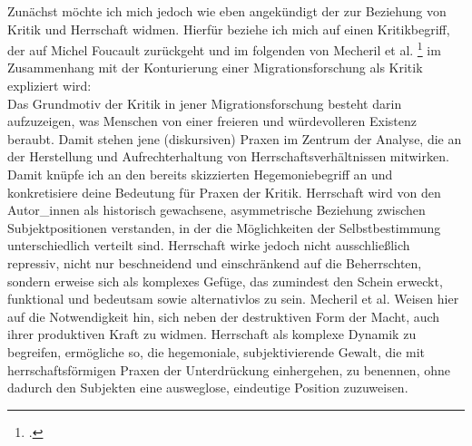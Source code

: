Zunächst möchte ich mich jedoch wie eben angekündigt der zur Beziehung von
Kritik und Herrschaft widmen. Hierfür beziehe ich mich auf einen Kritikbegriff,
der auf Michel Foucault zurückgeht und im folgenden von Mecheril et al.
\footnotemark \footcitetext{mecherilmigration} im
Zusammenhang mit der Konturierung einer Migrationsforschung als Kritik
expliziert wird: \\ 
Das Grundmotiv der Kritik in jener Migrationsforschung
besteht darin aufzuzeigen, was Menschen von einer freieren und würdevolleren
Existenz beraubt. Damit stehen jene (diskursiven) Praxen im Zentrum der
Analyse, die an der Herstellung und Aufrechterhaltung von
Herrschaftsverhältnissen mitwirken.\footnotemark {}
Damit knüpfe ich an den bereits
skizzierten Hegemoniebegriff an und konkretisiere deine Bedeutung für Praxen
der Kritik. Herrschaft wird von den Autor\_innen als historisch gewachsene,
asymmetrische Beziehung zwischen Subjektpositionen verstanden, in der die
Möglichkeiten der Selbstbestimmung unterschiedlich verteilt sind. Herrschaft
wirke jedoch nicht ausschließlich repressiv, nicht nur beschneidend und
einschränkend auf die Beherrschten, sondern erweise sich als komplexes Gefüge,
das zumindest den Schein erweckt, \glqq funktional und bedeutsam \grqq 
\footnotemark {} sowie
alternativlos zu sein. Mecheril et al. Weisen hier auf die Notwendigkeit hin,
sich neben der destruktiven Form der Macht, auch ihrer produktiven Kraft zu
widmen. Herrschaft als komplexe Dynamik zu begreifen, ermögliche so, die
hegemoniale, subjektivierende Gewalt, die mit herrschaftsförmigen Praxen der
Unterdrückung einhergehen, zu benennen, ohne dadurch den Subjekten eine
ausweglose, eindeutige Position zuzuweisen.\footnotemark {}

